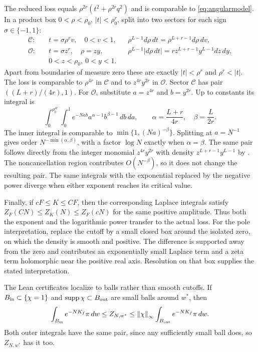 \documentclass[11pt,letterpaper]{amsart}
\theoremstyle{scplain}
\newcommand{\norm}[1]{\left\lVert#1\right\rVert}
\DeclareMathOperator{\supp}{supp}
\begin{document}
The reduced loss equals $\rho^{2r}(t^2+\rho^{2r}q^2)$ and is comparable to \eqref{eq:angularmodel}. In a product box $0<\rho<\rho_0$, $|t|<\rho_0^r$, split into two sectors for each sign $\sigma\in\{-1,1\}$:
\begin{align*}
 \mathcal C:&\quad t=\sigma\rho^r v,\quad 0<v<1,
 &&\rho^{L-1}d\rho\,dt=\rho^{L+r-1}d\rho\,dv,\\
 \mathcal O:&\quad t=\sigma z^r,\quad \rho=zy,
 &&\rho^{L-1}|d\rho\,dt|=r z^{L+r-1}y^{L-1}dz\,dy,\\
 &\quad 0<z<\rho_0,\ 0<y<1.
\end{align*}
Apart from boundaries of measure zero these are exactly $|t|<\rho^r$ and $\rho^r<|t|$. The loss is comparable to $\rho^{4r}$ in $\mathcal C$ and to $z^{4r}y^{2r}$ in $\mathcal O$. Sector $\mathcal C$ has pair $((L+r)/(4r),1)$. For $\mathcal O$, substitute $a=z^{4r}$ and $b=y^{2r}$. Up to constants its integral is
\[
 \int_0^{\rho_0^{4r}}\!\int_0^1 e^{-Nab}a^{\alpha-1}b^{\beta-1}\,db\,da,
 \qquad \alpha=\frac{L+r}{4r},\quad\beta=\frac{L}{2r}.
\]
The inner integral is comparable to $\min\{1,(Na)^{-\beta}\}$. Splitting at $a=N^{-1}$ gives order $N^{-\min(\alpha,\beta)}$, with a factor $\log N$ exactly when $\alpha=\beta$. The same pair follows directly from the integer monomial $z^{4r}y^{2r}$ with density $z^{L+r-1}y^{L-1}$ by \citet[Proposition 2.1]{lin2017}. The noncancellation region contributes $O(N^{-\beta})$, so it does not change the resulting pair. The same integrals with the exponential replaced by the negative power diverge when either exponent reaches its critical value.

Finally, if $cF\le K\le CF$, then the corresponding Laplace integrals satisfy $Z_F(CN)\le Z_K(N)\le Z_F(cN)$ for the same positive amplitude. Thus both the exponent and the logarithmic power transfer to the actual loss. For the pole interpretation, replace the cutoff by a small closed box around the isolated zero, on which the density is smooth and positive. The difference is supported away from the zero and contributes an exponentially small Laplace term and a zeta term holomorphic near the positive real axis. Resolution on that box supplies the stated interpretation.

The Lean certificates localize to balls rather than smooth cutoffs. If $B_{\rm in}\subset\{\chi=1\}$ and $\supp\chi\subset B_{\rm out}$ are small balls around $w^*$, then
\[
 \int_{B_{\rm in}}e^{-NK_f}\pi\,dw\le Z_{N,w^*}\le\norm{\chi}_\infty\int_{B_{\rm out}}e^{-NK_f}\pi\,dw.
\]
Both outer integrals have the same pair, since any sufficiently small ball does, so $Z_{N,w^*}$ has it too.
\end{document}
